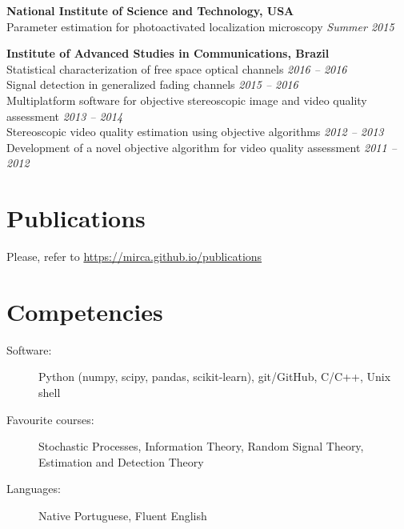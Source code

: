 \documentclass[10pt]{article}
\begin{document}
\begin{titlepage}
    \textbf{National Institute of Science and Technology, USA}\\
    Parameter estimation for photoactivated localization microscopy
    \hfill \textit{Summer 2015}
    \vspace{.5cm}

    \textbf{Institute of Advanced Studies in Communications, Brazil}\\
    Statistical characterization of free space optical channels \hfill \emph{2016 -- 2016}  \\
    Signal detection in generalized fading channels \hfill \emph{2015 -- 2016} \\
    Multiplatform software for objective stereoscopic image and video quality assessment \hfill \emph{2013 -- 2014} \\
    Stereoscopic video quality estimation using objective algorithms \hfill \emph{2012 -- 2013} \\
    Development of a novel objective algorithm for video quality assessment \hfill \emph{2011 -- 2012}

\section*{Publications}
Please, refer to \url{https://mirca.github.io/publications}

\section*{Competencies}
\begin{description}
    \item[Software:] Python (numpy, scipy, pandas, scikit-learn), git/GitHub, C/C++, Unix shell
    \item[Favourite courses:] Stochastic Processes, Information Theory, Random Signal Theory, Estimation and Detection Theory
    \item[Languages:] Native Portuguese, Fluent English
\end{description}


\end{titlepage}
\end{document}
